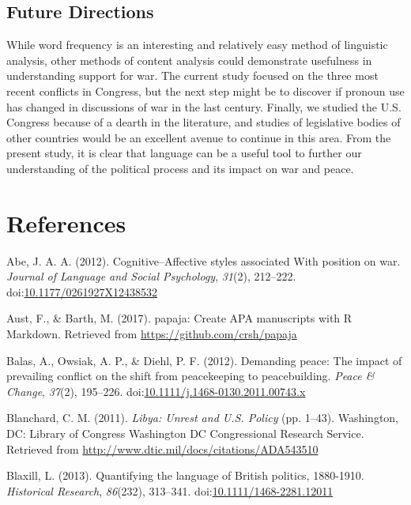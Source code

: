 \documentclass[english,man]{apa6}
\theoremstyle{definition}
\theoremstyle{definition}
\theoremstyle{definition}
\theoremstyle{remark}
\begin{document}
\subsection{Future Directions}\label{future-directions}

While word frequency is an interesting and relatively easy method of
linguistic analysis, other methods of content analysis could demonstrate
usefulness in understanding support for war. The current study focused
on the three most recent conflicts in Congress, but the next step might
be to discover if pronoun use has changed in discussions of war in the
last century. Finally, we studied the U.S. Congress because of a dearth
in the literature, and studies of legislative bodies of other countries
would be an excellent avenue to continue in this area. From the present
study, it is clear that language can be a useful tool to further our
understanding of the political process and its impact on war and peace.

\newpage

\section{References}\label{references}

\setlength{\parindent}{-0.5in} \setlength{\leftskip}{0.5in}

\hypertarget{refs}{}
\hypertarget{ref-Abe2012}{}
Abe, J. A. A. (2012). Cognitive--Affective styles associated With
position on war. \emph{Journal of Language and Social Psychology},
\emph{31}(2), 212--222.
doi:\href{https://doi.org/10.1177/0261927X12438532}{10.1177/0261927X12438532}

\hypertarget{ref-Aust2017}{}
Aust, F., \& Barth, M. (2017). papaja: Create APA manuscripts with R
Markdown. Retrieved from \url{https://github.com/crsh/papaja}

\hypertarget{ref-Balas2012}{}
Balas, A., Owsiak, A. P., \& Diehl, P. F. (2012). Demanding peace: The
impact of prevailing conflict on the shift from peacekeeping to
peacebuilding. \emph{Peace \& Change}, \emph{37}(2), 195--226.
doi:\href{https://doi.org/10.1111/j.1468-0130.2011.00743.x}{10.1111/j.1468-0130.2011.00743.x}

\hypertarget{ref-Blanchard2011}{}
Blanchard, C. M. (2011). \emph{Libya: Unrest and U.S. Policy} (pp.
1--43). Washington, DC: Library of Congress Washington DC Congressional
Research Service. Retrieved from
\url{http://www.dtic.mil/docs/citations/ADA543510}

\hypertarget{ref-Blaxill2013}{}
Blaxill, L. (2013). Quantifying the language of British politics,
1880-1910. \emph{Historical Research}, \emph{86}(232), 313--341.
doi:\href{https://doi.org/10.1111/1468-2281.12011}{10.1111/1468-2281.12011}
\end{document}
